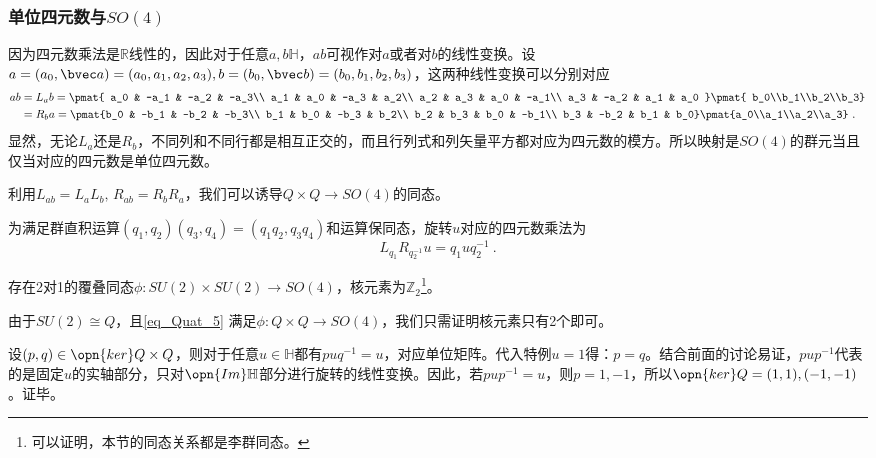 \subsubsection{单位四元数与$SO(4)$}
因为四元数乘法是$\mathbb R$线性的，因此对于任意$a,b\mathbb H$，$ab$可视作对$a$或者对$b$的线性变换。设$a=(a_0,\bvec a)=(a_0,a_1,a_2,a_3),b=(b_0,\bvec b)=(b_0,b_1,b_2,b_3)$，这两种线性变换可以分别对应
\begin{equation}
\begin{aligned}
ab &=L_ab= \pmat{
a_0 & -a_1 & -a_2 & -a_3\\
a_1 & a_0 & -a_3 & a_2\\
a_2 & a_3 & a_0 & -a_1\\
a_3 & -a_2 & a_1 & a_0
}\pmat{
b_0\\b_1\\b_2\\b_3}\\
&= R_ba=\pmat{b_0 & -b_1 & -b_2 & -b_3\\
b_1 & b_0 & -b_3 & b_2\\
b_2 & b_3 & b_0 & -b_1\\
b_3 & -b_2 & b_1 & b_0}\pmat{a_0\\a_1\\a_2\\a_3}~.
\end{aligned}
\end{equation}
显然，无论$L_a$还是$R_b$，不同列和不同行都是相互正交的，而且行列式和列矢量平方都对应为四元数的模方。所以映射是$SO(4)$的群元当且仅当对应的四元数是单位四元数。

利用$L_{ab}=L_aL_b,\,R_{ab}=R_bR_a$，我们可以诱导$Q\times Q\to SO(4)$的同态。

为满足群直积运算$(q_1,q_2)(q_3,q_4)=(q_1q_2,q_3q_4)$和运算保同态，旋转$u$对应的四元数乘法为
\begin{equation}\label{eq_Quat_5}
L_{q_1}R_{q_2^{-1}}u=q_1uq_2^{-1}~.
\end{equation}
\begin{theorem}{}\label{the_Quat_1}
存在2对1的覆叠同态$\phi:SU(2)\times SU(2)\to SO(4)$，核元素为$\mathbb Z_2$\footnote{可以证明，本节的同态关系都是李群同态。}。
\end{theorem}

由于$SU(2)\cong Q$，且\autoref{eq_Quat_5} 满足$\phi:Q\times Q\to SO(4)$，我们只需证明核元素只有2个即可。

设$(p,q)\in \opn{ker}Q\times Q$，则对于任意$u\in \mathbb H$都有$puq^{-1}=u$，对应单位矩阵。代入特例$u=1$得：$p=q$。结合前面的讨论易证，$pup^{-1}$代表的是固定$u$的实轴部分，只对$\opn{Im}\mathbb H$部分进行旋转的线性变换。因此，若$pup^{-1}=u$，则$p=1,-1$，所以$\opn{ker}Q=(1,1),(-1,-1)$。证毕。